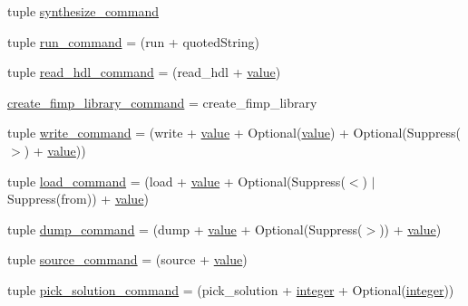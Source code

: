 \begin{DoxyCompactItemize}
tuple \hyperlink{namespacesylva_1_1misc_1_1tcl__parser_a049055f00db6c830fd559bbf6724c726}{synthesize\+\_\+command}
\item 
tuple \hyperlink{namespacesylva_1_1misc_1_1tcl__parser_a0500d8c917dada620c715ee30d46c764}{run\+\_\+command} = (run + quoted\+String)
\item 
tuple \hyperlink{namespacesylva_1_1misc_1_1tcl__parser_a76796ee2f152c59afca41bc3c4977b81}{read\+\_\+hdl\+\_\+command} = (read\+\_\+hdl + \hyperlink{namespacesylva_1_1misc_1_1tcl__parser_a83a1a4d978bc1a8a1bd92f71b754bad9}{value})
\item 
\hyperlink{namespacesylva_1_1misc_1_1tcl__parser_a00e21364c10011f454cb83c1cdcdd5f2}{create\+\_\+fimp\+\_\+library\+\_\+command} = create\+\_\+fimp\+\_\+library
\item 
tuple \hyperlink{namespacesylva_1_1misc_1_1tcl__parser_a6ce51189f962d0d4e7cdcf224371100c}{write\+\_\+command} = (write + \hyperlink{namespacesylva_1_1misc_1_1tcl__parser_a83a1a4d978bc1a8a1bd92f71b754bad9}{value} + Optional(\hyperlink{namespacesylva_1_1misc_1_1tcl__parser_a83a1a4d978bc1a8a1bd92f71b754bad9}{value}) + Optional(Suppress(\textquotesingle{}$>$\textquotesingle{}) + \hyperlink{namespacesylva_1_1misc_1_1tcl__parser_a83a1a4d978bc1a8a1bd92f71b754bad9}{value}))
\item 
tuple \hyperlink{namespacesylva_1_1misc_1_1tcl__parser_a31cbff9e620c0f82c424f20ea7e70ecb}{load\+\_\+command} = (load + \hyperlink{namespacesylva_1_1misc_1_1tcl__parser_a83a1a4d978bc1a8a1bd92f71b754bad9}{value} + Optional(Suppress(\textquotesingle{}$<$\textquotesingle{}) $\vert$ Suppress(\textquotesingle{}from\textquotesingle{})) + \hyperlink{namespacesylva_1_1misc_1_1tcl__parser_a83a1a4d978bc1a8a1bd92f71b754bad9}{value})
\item 
tuple \hyperlink{namespacesylva_1_1misc_1_1tcl__parser_ad63aacf8188d9604a6876b638b975522}{dump\+\_\+command} = (dump + \hyperlink{namespacesylva_1_1misc_1_1tcl__parser_a83a1a4d978bc1a8a1bd92f71b754bad9}{value} + Optional(Suppress(\textquotesingle{}$>$\textquotesingle{})) + \hyperlink{namespacesylva_1_1misc_1_1tcl__parser_a83a1a4d978bc1a8a1bd92f71b754bad9}{value})
\item 
tuple \hyperlink{namespacesylva_1_1misc_1_1tcl__parser_ad3eb2c3b522821a7537d99228f52138f}{source\+\_\+command} = (source + \hyperlink{namespacesylva_1_1misc_1_1tcl__parser_a83a1a4d978bc1a8a1bd92f71b754bad9}{value})
\item 
tuple \hyperlink{namespacesylva_1_1misc_1_1tcl__parser_aa1c1c65eee0114087b82afaa297507b0}{pick\+\_\+solution\+\_\+command} = (pick\+\_\+solution + \hyperlink{namespacesylva_1_1misc_1_1tcl__parser_aaa6da6af48cbfc02e2f6edd078ea16ab}{integer} + Optional(\hyperlink{namespacesylva_1_1misc_1_1tcl__parser_aaa6da6af48cbfc02e2f6edd078ea16ab}{integer}))

\end{DoxyCompactItemize}
